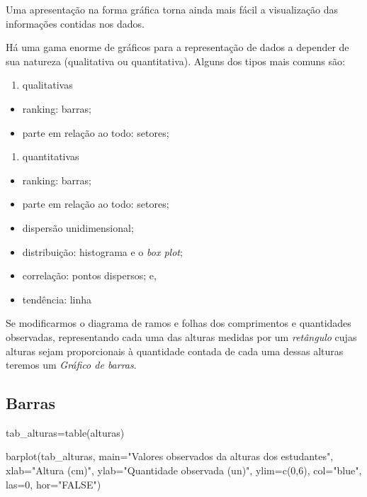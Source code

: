 \documentclass[
]{book}
\newenvironment{Shaded}{\begin{snugshade}}{\end{snugshade}}
\newcommand{\AttributeTok}[1]{\textcolor[rgb]{0.77,0.63,0.00}{#1}}
\newcommand{\DecValTok}[1]{\textcolor[rgb]{0.00,0.00,0.81}{#1}}
\newcommand{\FunctionTok}[1]{\textcolor[rgb]{0.00,0.00,0.00}{#1}}
\newcommand{\NormalTok}[1]{#1}
\newcommand{\OtherTok}[1]{\textcolor[rgb]{0.56,0.35,0.01}{#1}}
\newcommand{\StringTok}[1]{\textcolor[rgb]{0.31,0.60,0.02}{#1}}
\providecommand{\tightlist}{%
  \setlength{\itemsep}{0pt}\setlength{\parskip}{0pt}}
\begin{document}
Uma apresentação na forma gráfica torna ainda mais fácil a visualização das informações contidas nos dados.

Há uma gama enorme de gráficos para a representação de dados a depender de sua natureza (qualitativa ou quantitativa). Alguns dos tipos mais comuns são:

\begin{enumerate}
\def\labelenumi{\arabic{enumi}.}
\tightlist
\item
  qualitativas
\end{enumerate}

\begin{itemize}
\tightlist
\item
  ranking: barras;
\item
  parte em relação ao todo: setores;
\end{itemize}

\begin{enumerate}
\def\labelenumi{\arabic{enumi}.}
\setcounter{enumi}{1}
\tightlist
\item
  quantitativas
\end{enumerate}

\begin{itemize}
\tightlist
\item
  ranking: barras;
\item
  parte em relação ao todo: setores;
\item
  dispersão unidimensional;
\item
  distribuição: histograma e o \emph{box plot};
\item
  correlação: pontos dispersos; e,
\item
  tendência: linha
\end{itemize}

Se modificarmos o diagrama de ramos e folhas dos comprimentos e quantidades observadas, representando cada uma das alturas medidas por um \emph{retângulo} cujas alturas sejam proporcionais à quantidade contada de cada uma dessas alturas teremos um \emph{Gráfico de barras}.

\hypertarget{barras}{%
\subsection{Barras}\label{barras}}

\begin{Shaded}
\begin{Highlighting}[]
\NormalTok{tab\_alturas}\OtherTok{=}\FunctionTok{table}\NormalTok{(alturas)}

\FunctionTok{barplot}\NormalTok{(tab\_alturas,}
        \AttributeTok{main=}\StringTok{"Valores observados da alturas dos estudantes"}\NormalTok{,}
        \AttributeTok{xlab=}\StringTok{"Altura (cm)"}\NormalTok{,}
        \AttributeTok{ylab=}\StringTok{"Quantidade observada (un)"}\NormalTok{,}
        \AttributeTok{ylim=}\FunctionTok{c}\NormalTok{(}\DecValTok{0}\NormalTok{,}\DecValTok{6}\NormalTok{),}
        \AttributeTok{col=}\StringTok{"blue"}\NormalTok{,}
        \AttributeTok{las=}\DecValTok{0}\NormalTok{, }
        \AttributeTok{hor=}\StringTok{"FALSE"}\NormalTok{)}
\end{Highlighting}
\end{Shaded}
\end{document}
